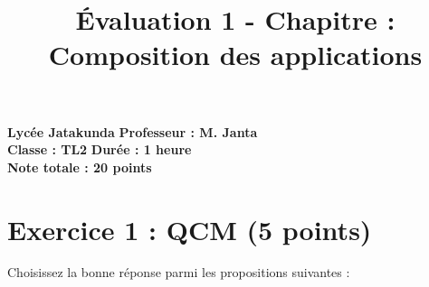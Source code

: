 \documentclass[a4paper,12pt]{article}
\begin{document}
\title{Évaluation 1 - Chapitre : Composition des applications}
\author{}
\date{}
\maketitle

\noindent \textbf{Lycée Jatakunda} \hfill \textbf{Professeur : M. Janta} \\
\noindent \textbf{Classe : TL2} \hfill \textbf{Durée : 1 heure} \\
\noindent \textbf{Note totale : 20 points} \\

\vspace{0.5cm}

\section*{Exercice 1 : QCM (5 points)}
Choisissez la bonne réponse parmi les propositions suivantes :
\end{document}
